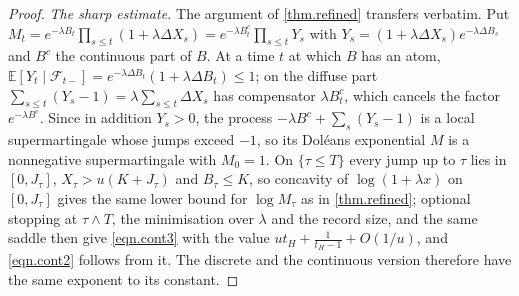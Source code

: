 \documentclass[12pt,oneside,reqno,fleqn]{amsart}
\numberwithin{equation}{section}
\theoremstyle{remark}
\newcommand\cff{{\mathcal F}}
\newcommand\mE{{\mathbb E}}
\newcommand\E{\mE}
\newcommand{\1}{{\mathbf 1}}
\renewcommand{\le}{\leq}
\begin{document}
\begin{proof}
				\emph{The sharp estimate.} The argument of \cref{thm.refined} transfers verbatim. Put $M_t=e^{-\lambda B_t}\prod_{s\le t}(1+\lambda\Delta X_s)=e^{-\lambda B^c_t}\prod_{s\le t}Y_s$ with $Y_s=(1+\lambda\Delta X_s)e^{-\lambda\Delta B_s}$ and $B^c$ the continuous part of $B$. At a time $t$ at which $B$ has an atom, $\E[Y_t\mid\cff_{t-}]=e^{-\lambda\Delta B_t}(1+\lambda\Delta B_t)\le1$; on the diffuse part $\sum_{s\le t}(Y_s-1)=\lambda\sum_{s\le t}\Delta X_s$ has compensator $\lambda B^c_t$, which cancels the factor $e^{-\lambda B^c}$. Since in addition $Y_s>0$, the process $-\lambda B^c+\sum_s(Y_s-1)$ is a local supermartingale whose jumps exceed $-1$, so its Dol\'eans exponential $M$ is a nonnegative supermartingale with $M_0=1$. On $\{\tau\le T\}$ every jump up to $\tau$ lies in $[0,J_\tau]$, $X_\tau>u(K+J_\tau)$ and $B_\tau\le K$, so concavity of $\log(1+\lambda x)$ on $[0,J_\tau]$ gives the same lower bound for $\log M_\tau$ as in \cref{thm.refined}; optional stopping at $\tau\wedge T$, the minimisation over $\lambda$ and the record size, and the same saddle then give \eqref{eqn.cont3} with the value $ut_H+\frac1{t_H-1}+O(1/u)$, and \eqref{eqn.cont2} follows from it. The discrete and the continuous version therefore have the same exponent to its constant.
	\end{proof}
\end{document}
